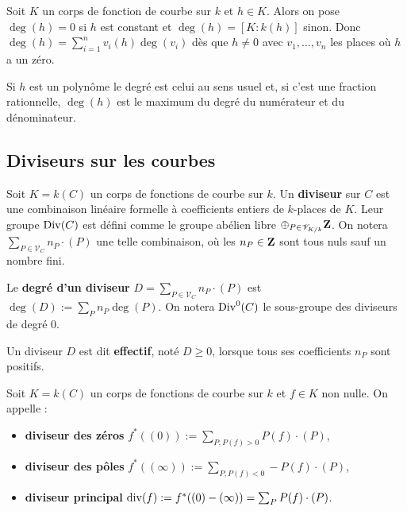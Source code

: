 	\begin{defn}
		Soit $K$ un corps de fonction de courbe sur $k$ et $h \in K$.
		Alors on pose $\deg(h) = 0$ si $h$ est constant et $\deg(h) = [K : k(h)]$ sinon.
		Donc $\deg(h) = \sum_{i = 1}^n v_i(h) \deg(v_i)$ dès que $h \neq 0$ avec $v_1,\ldots,v_n$ les places où $h$ a un zéro.
	\end{defn}
	
	Si $h$ est un polynôme le degré est celui au sens usuel et, si c'est une fraction rationnelle, $\deg(h)$ est le maximum du degré du numérateur et du dénominateur.


\subsection{Diviseurs sur les courbes}

	\begin{defn}
		Soit $K = k(C)$ un corps de fonctions de courbe sur $k$.
		Un \textbf{diviseur} sur $C$ est une combinaison linéaire formelle à coefficients entiers de $k$-places de $K$.
		Leur groupe $\operatorname{Div}(C)$ est défini comme le groupe abélien libre $\oplus_{P \in \mathscr{V}_{K/k}} \mathbf{Z}$.
		On notera $\sum_{P \in \mathscr{V}_C} n_P \cdot (P)$ une telle combinaison, où les $n_P \in \mathbf{Z}$ sont tous nuls sauf un nombre fini.
	\end{defn}
	
	\begin{defn}
		Le \textbf{degré d'un diviseur} $D = \sum_{P \in \mathscr{V}_C} n_P \cdot (P)$ est $\deg(D) := \sum_P n_P \deg(P)$.
		On notera $\operatorname{Div}^0(C)$ le sous-groupe des diviseurs de degré $0$.
	\end{defn}
	
	\begin{defn}
		Un diviseur $D$ est dit \textbf{effectif}, noté $D \geq 0$, lorsque tous ses coefficients $n_P$ sont positifs.
	\end{defn}
	
	\begin{defn}
		Soit $K = k(C)$ un corps de fonctions de courbe sur $k$ et $f \in K$ non nulle.
		On appelle :
		\begin{itemize}
			\item[\textbullet] \textbf{diviseur des zéros} $f^*((0)) := \sum_{P, P(f) > 0} P(f) \cdot (P)$,
			\item[\textbullet] \textbf{diviseur des pôles} $f^*((\infty)) := \sum_{P, P(f) < 0} - P(f) \cdot (P)$,
			\item[\textbullet] \textbf{diviseur principal} $\operatorname{div}(f) := f^*((0) - (\infty)) = \sum_P P(f) \cdot (P)$.
		\end{itemize}
	\end{defn}
	
